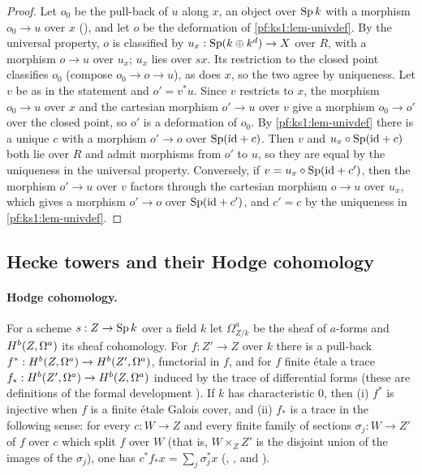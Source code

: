 \begin{proof}
Let $o_0$ be the pull-back of $u$ along $x$, an object over $\ksoneSp k$ with a morphism $o_0\to u$ over $x$
(), and let $o$ be the deformation of \cref{pf:ks1:lem-univdef}. By the universal
property, $o$ is classified by $u_x:\ksoneSp(k\oplus k^d)\to X$ over $R$, with a morphism $o\to u$ over $u_x$; $u_x$ lies over $sx$. Its restriction
to the closed point classifies $o_0$ (compose $o_0\to o\to u$), as does $x$, so the two agree by uniqueness. Let $v$ be as in the statement and
$o'=v^*u$. Since $v$ restricts to $x$, the morphism $o_0\to u$ over $x$ and the cartesian morphism $o'\to u$ over $v$ give a morphism $o_0\to o'$
over the closed point, so $o'$ is a deformation of $o_0$. By \cref{pf:ks1:lem-univdef} there is a unique $c$ with a morphism $o'\to o$ over
$\ksoneSp(\mathrm{id}+c)$. Then $v$ and $u_x\circ\ksoneSp(\mathrm{id}+c)$ both lie over $R$ and admit morphisms from $o'$ to $u$, so they are equal by
the uniqueness in the universal property. Conversely, if $v=u_x\circ\ksoneSp(\mathrm{id}+c')$, then the morphism $o'\to u$ over $v$ factors
through the cartesian morphism $o\to u$ over $u_x$, which gives a morphism $o'\to o$ over $\ksoneSp(\mathrm{id}+c')$, and $c'=c$ by the uniqueness in
\cref{pf:ks1:lem-univdef}.
\end{proof}

\subsection{Hecke towers and their Hodge cohomology}\label{pf:ks1:sec-towers}

\paragraph{Hodge cohomology.} For a scheme $s:Z\to\ksoneSp k$ over a field $k$ let $\Omega^a_{Z/k}$ be the
sheaf of $a$-forms and $\ksoneH{Z}{a}{b}$ its sheaf cohomology. For $f:Z'\to Z$ over $k$ there is a pull-back
$f^*:\ksoneH{Z}{a}{b}\to\ksoneH{Z'}{a}{b}$, functorial in $f$, and for $f$ finite \'etale a trace
$f_*:\ksoneH{Z'}{a}{b}\to\ksoneH{Z}{a}{b}$ induced by the trace of differential forms (these are definitions of
the formal development \cite{LeanSource2026}). If $k$ has characteristic $0$, then (i) $f^*$ is injective when $f$ is a
finite \'etale Galois cover, and (ii) $f_*$ is a trace in the following sense: for every $c:W\to Z$ and every finite
family of sections $\sigma_j:W\to Z'$ of $f$ over $c$ which split $f$ over $W$ (that is, $W\times_ZZ'$ is the disjoint
union of the images of the $\sigma_j$), one has $c^*f_*x=\sum_j\sigma_j^*x$
(, , and ).

